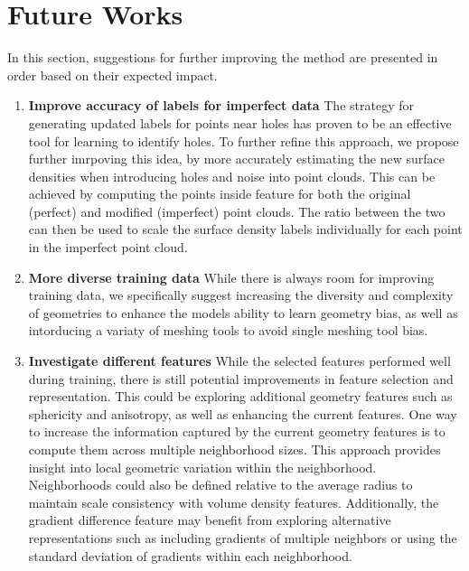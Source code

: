 \section{Future Works}
In this section, suggestions for further improving the method are presented in order based on their expected impact.

\begin{enumerate}
  \item \textbf{Improve accuracy of labels for imperfect data}
  The strategy for generating updated labels for points near holes has proven to be an effective tool for learning to identify holes. To further refine this approach, we propose further imrpoving this idea, by more accurately estimating the new surface densities when introducing holes and noise into point clouds. This can be achieved by computing the points inside feature for both the original (perfect) and modified (imperfect) point clouds. The ratio between the two can then be used to scale the surface density labels individually for each point in the imperfect point cloud.

  \item \textbf{More diverse training data}
  While there is always room for improving training data, we specifically suggest increasing the diversity and complexity of geometries to enhance the models ability to learn geometry bias, as well as intorducing a variaty of meshing tools to avoid single meshing tool bias.

  \item \textbf{Investigate different features}
  While the selected features performed well during training, there is still potential improvements in feature selection and representation. This could be exploring additional geometry features such as sphericity and anisotropy, as well as enhancing the current features. One way to increase the information captured by the current geometry features is to compute them across multiple neighborhood sizes. This approach provides insight into local geometric variation within the neighborhood. Neighborhoods could also be defined relative to the average radius to maintain scale consistency with volume density features. Additionally, the gradient difference feature may benefit from exploring alternative representations such as including gradients of multiple neighbors or using the standard deviation of gradients within each neighborhood.
\end{enumerate}